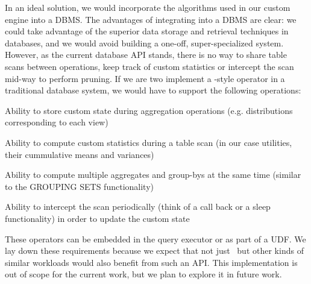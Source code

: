 In an ideal solution, we would incorporate the algorithms used in our custom
engine into a DBMS. 
The advantages of integrating into a DBMS are clear: we could take advantage of
the superior data storage and retrieval techniques in databases, and we would
avoid building a one-off, super-specialized system.
However, as the current database API stands, there is no way to share table
scans between operations, keep track of custom statistics or intercept the scan
mid-way to perform pruning.
If we are two implement a \VizRecDB-style operator in a traditional database
system, we would have to support the following operations:
\squishlist
\item Ability to store custom state during aggregation operations (e.g.
distributions corresponding to each view)
\item Ability to compute custom statistics during a table scan (in our case
utilities, their cummulative means and variances)
\item Ability to compute multiple aggregates and group-bys at the same time
(similar to the GROUPING SETS functionality)
\item Ability to intercept the scan periodically (think of a call back or a
sleep functionality) in order to update the custom state
\squishend

These operators can be embedded in the query executor or as part of a UDF.
We lay down these requirements because we expect that not just \VizRecDB\ but
other kinds of similar workloads would also benefit from such an API.
This implementation is out of scope for the current work, but we plan to explore
it in future work.
